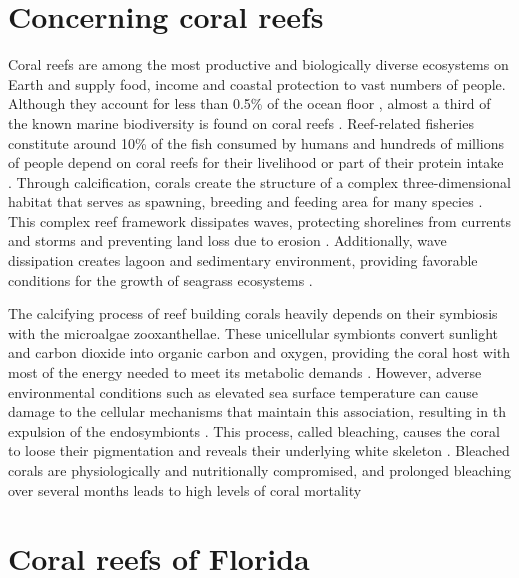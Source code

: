 \documentclass[12pt ,a4paper]{article}
\begin{document}
\section{Concerning coral reefs}

Coral reefs are among the most productive and biologically diverse ecosystems on Earth \citep{connell1978diversity, moberg1999ecological} and supply food, income and coastal protection to vast numbers of people. Although they account for less than 0.5\% of the ocean floor \citep{spalding1997new}, almost a third of the known marine biodiversity is found on coral reefs \citep{moberg1999ecological}. Reef-related fisheries constitute around 10\% of the fish consumed by humans \citep{smith1978coral} and hundreds of millions of people depend on coral reefs for their livelihood or part of their protein intake \citep{salvat1992coral,hoegh2019people}. Through calcification, corals create the structure of a complex three-dimensional habitat that serves as spawning, breeding and feeding area for many species \citep{moberg1999ecological}. This complex reef framework  dissipates waves, protecting shorelines from currents and storms and preventing land loss due to erosion \citep{ferrario2014effectiveness,elliff2017coral}. Additionally, wave dissipation creates lagoon and sedimentary environment, providing favorable conditions for the growth of seagrass ecosystems \citep{moberg1999ecological}.


The calcifying process of reef building corals heavily depends on their symbiosis with the microalgae zooxanthellae. These unicellular symbionts convert sunlight and carbon dioxide into organic carbon and oxygen, providing the coral host with most of the energy needed to meet its metabolic demands \citep{muscatine1977reef}. However, adverse environmental conditions such as elevated sea surface temperature can cause damage to the cellular mechanisms that maintain this association, resulting in th expulsion of the endosymbionts \citep{hoegh2007coral}. This process, called bleaching, causes the coral to loose their pigmentation and reveals their underlying white skeleton \citep{baker2008climate}. Bleached corals are physiologically and nutritionally compromised, and prolonged bleaching over several months leads to high levels of coral mortality \citep{hughes2018spatial}

\section{Coral reefs of Florida}
\end{document}
